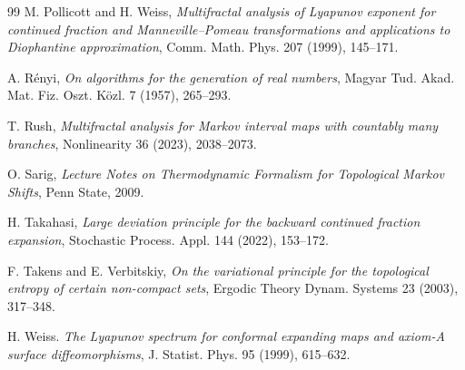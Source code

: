 \documentclass[12pt,reqno]{amsart}
\renewcommand{\=}{\coloneqq}
\theoremstyle{plain}
\begin{document}
\begin{thebibliography}{99}
 M. Pollicott and H. Weiss, {\it Multifractal analysis of Lyapunov exponent for continued fraction and Manneville--Pomeau transformations and applications to Diophantine approximation}, Comm. Math. Phys. 207 (1999), 145--171.

 A. R\'{e}nyi, {\it On algorithms for the generation of real numbers}, Magyar Tud. Akad. Mat. Fiz. Oszt. K\"{o}zl. 7 (1957), 265--293.


 T. Rush, {\it Multifractal analysis for Markov interval maps with countably many branches}, Nonlinearity 36 (2023), 2038--2073.





 O. Sarig, {\it Lecture Notes on Thermodynamic Formalism for Topological Markov Shifts}, Penn State, 2009.



 H. Takahasi, {\it Large deviation principle for the backward continued fraction expansion}, Stochastic Process. Appl. 144 (2022), 153--172.

 F. Takens and E. Verbitskiy, {\it On the variational principle for the topological entropy of certain non-compact sets}, Ergodic Theory Dynam. Systems 23 (2003), 317--348.


 H. Weiss. {\it The Lyapunov spectrum for conformal expanding maps and axiom-A surface diffeomorphisms}, J. Statist. Phys. 95 (1999), 615--632.


\end{thebibliography}
\end{document}
